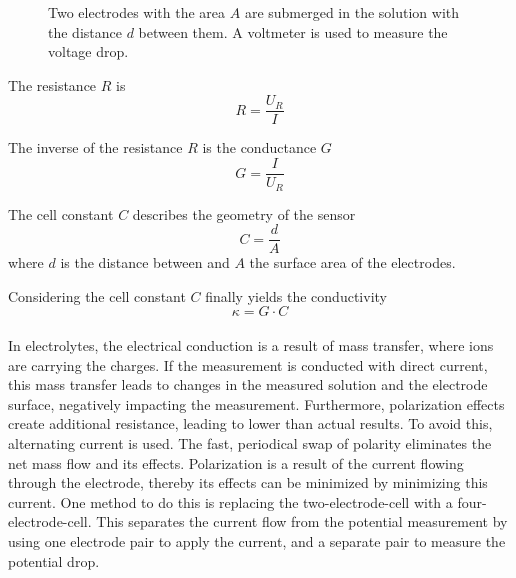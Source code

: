 \begin{figure}
	\begin{center}
    	\tikzset{external/export next=false}
		\caption[Two electrodes submerged in the solution.]{Two electrodes with the area $A$ are submerged in the solution with the distance $d$ between them. A voltmeter is used to measure the voltage drop.}
		\label{fig:elec}
	\end{center}
\end{figure}

The resistance $ R $ is
\begin{equation}
	R = \dfrac{U_R}{I}
\label{eq:R}
\end{equation}

The inverse of the resistance $ R $ is the conductance $ G $
\begin{equation}
	G = \dfrac{I}{U_R}
\label{eq:G}
\end{equation}

The cell constant $ C $ describes the geometry of the sensor
\begin{equation}
	C = \dfrac{d}{A}
\label{eq:C}
\end{equation}
where $ d $ is the distance between and $ A $ the surface area of  the electrodes. 

Considering the cell constant $ C $ finally yields the conductivity
\begin{equation}
	\kappa = G \cdot C
\label{eq:kappa} 
\end{equation}
\\

In electrolytes, the electrical conduction is a result of mass transfer, where ions are carrying the charges. If the measurement is conducted with direct current, this mass transfer leads to changes in the measured solution and the electrode surface, negatively impacting the measurement. Furthermore, polarization effects create additional resistance, leading to lower than actual results. To avoid this, alternating current is used. The fast, periodical swap of polarity eliminates the net mass flow and its effects. Polarization is a result of the current flowing through the electrode, thereby its effects can be minimized by minimizing this current. One method to do this is replacing the two-electrode-cell with a four-electrode-cell.
This separates the current flow from the potential measurement by using one electrode pair to apply the current, and a separate pair to measure the potential drop. \\

